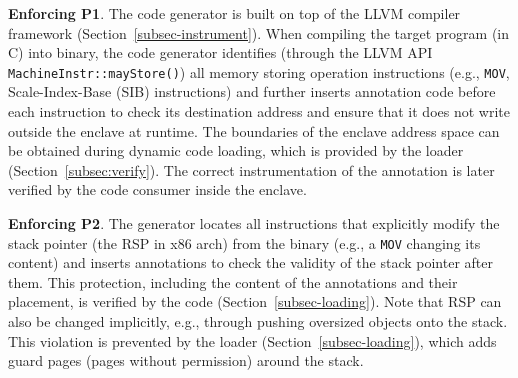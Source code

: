 




\vspace{3pt}\noindent\textbf{Enforcing P1}.  The code generator is built on top of the LLVM compiler framework (Section~\ref{subsec-instrument}). When compiling the target program (in C) into binary, the code generator identifies (through the LLVM API \verb|MachineInstr::mayStore()|) all memory storing operation instructions (e.g., \texttt{MOV}, Scale-Index-Base (SIB) instructions) and further inserts annotation code before each instruction to check its destination address and ensure that it does not write outside the enclave at runtime. 
The boundaries of the enclave address space can be obtained during dynamic code loading, which is provided by the loader (Section~\ref{subsec:verify}). The correct instrumentation of the annotation is later verified by the code consumer inside the enclave. 


\vspace{3pt}\noindent\textbf{Enforcing P2}. 
The generator locates all instructions that explicitly modify the stack pointer (the RSP in x86 arch) from the binary (e.g., a \texttt{MOV} changing its content) and inserts annotations to check the validity of the stack pointer after them. This protection, including the content of the annotations and their placement, is verified by the code \DIFdelbegin {}\DIFdelend \DIFaddbegin {}\DIFaddend (Section~\ref{subsec-loading}). 
Note that RSP can also be changed implicitly, e.g., through pushing oversized objects onto the stack. This violation is prevented by the loader (Section~\ref{subsec-loading}), which adds guard pages (pages without permission) around the stack. 

